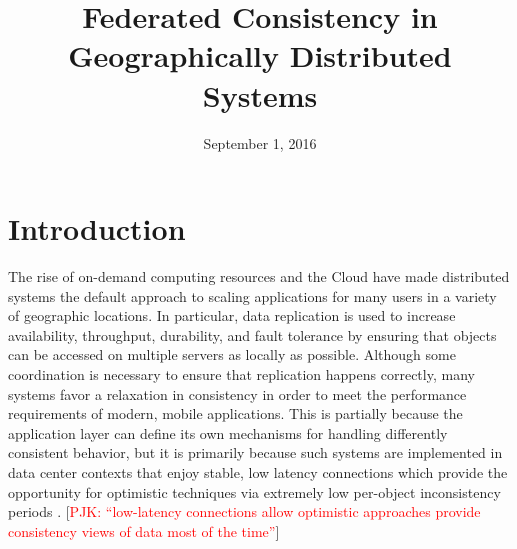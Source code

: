 \documentclass[10pt,conference,compsocconf,letterpaper]{IEEEtran}
\newcommand{\todo}[1]{{\textcolor{red}{#1}}}
\newcommand{\pjk}[1]{[\todo{PJK: #1}]}
\begin{document}
\title{Federated Consistency in Geographically Distributed Systems}
\author{
}


\date{September 1, 2016}


\maketitle

\IEEEdisplaynotcompsoctitleabstractindextext

\section{Introduction}

The rise of on-demand computing resources and the Cloud have made distributed systems the default approach to scaling applications for many users in a variety of geographic locations. In particular, data replication is used to increase availability, throughput, durability, and fault tolerance by ensuring that objects can be accessed on multiple servers as locally as possible. Although some coordination is necessary to ensure that replication happens correctly, many systems favor a relaxation in consistency in order to meet the performance requirements of modern, mobile applications. This is partially because the application layer can define its own mechanisms for handling differently consistent behavior, but it is primarily because such systems are implemented in data center contexts that enjoy stable, low latency connections which provide the opportunity for optimistic techniques via extremely low per-object inconsistency periods \cite{bailis_quantifying_2014,bermbach_metastorage:_2011}.
\pjk{``low-latency connections allow optimistic approaches provide consistency views of data most of the time''}
\end{document}
